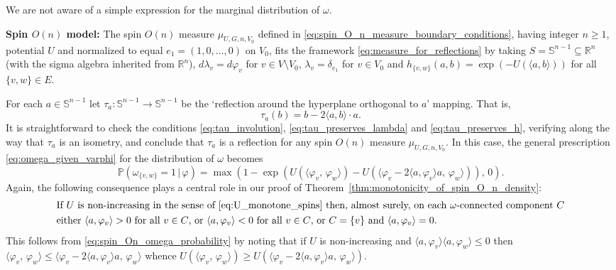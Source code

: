 \documentclass[english]{article}
\renewcommand{\P}{\mathbb{P}}
\theoremstyle{plain}
\theoremstyle{plain}
\begin{document}
We are not aware of a simple expression for the marginal
distribution of $\omega$.

{\bf Spin $O(n)$ model:} The spin $O(n)$ measure $\mu_{U,G,n,V_0}$
defined in \eqref{eq:spin_O_n_measure_boundary_conditions}, having integer $n\ge 1$, potential $U$
and normalized to equal $e_1=(1,0,\ldots,0)$ on $V_0$, fits the framework \eqref{eq:measure_for_reflections} by taking $S =
\mathbb{S}^{n-1}\subseteq\mathbb{R}^n$ (with the sigma algebra
inherited from $\mathbb{R}^n$), $d\lambda_v = d\varphi_v$ for $v\in V\setminus V_0$, $\lambda_v = \delta_{e_1}$ for $v\in V_0$ and $h_{\{v,w\}}(a,b)
= \exp(-U(\langle a,b\rangle))$ for all $\{v,w\}\in E$.

For each $a\in\mathbb{S}^{n-1}$ let
$\tau_a:\mathbb{S}^{n-1}\to\mathbb{S}^{n-1}$ be the `reflection
around the hyperplane orthogonal to $a$' mapping. That is,
\begin{equation}\label{eq:spin_system_reflection}
\tau_a(b) = b - 2\langle a,b\rangle\cdot a.
\end{equation}
It is straightforward
to check the conditions \eqref{eq:tau_involution},
\eqref{eq:tau_preserves_lambda} and \eqref{eq:tau_preserves_h}, verifying along the way that $\tau_a$ is an isometry, and
conclude that $\tau_a$ is a reflection for any spin $O(n)$ measure
$\mu_{U,G,n,V_0}$. In this case, the general prescription
\eqref{eq:omega_given_varphi} for the distribution of $\omega$
becomes
\begin{equation}\label{eq:spin_On_omega_probability}
  \P(\omega_{\{v,w\}} = 1\, |\, \varphi) = \max\left(1 -
  \exp(U(\langle \varphi_v,\, \varphi_w\rangle) - U(\langle\varphi_v - 2\langle a,\varphi_v\rangle a,\, \varphi_w\rangle)),\, 0\right).
\end{equation}
Again, the following consequence plays a central role in our proof
of Theorem~\ref{thm:monotonicity_of_spin_O_n_density}:
\begin{equation}\label{spin_one_sided_reflection}
\begin{split}
  &\text{If $U$ is non-increasing in the sense of
\eqref{eq:U_monotone_spins} then, almost surely, on each $\omega$-connected component $C$}\\
  &\text{either
$\langle a,\varphi_v\rangle> 0$ for all $v\in C$, or $\langle
a,\varphi_v\rangle< 0$ for all $v\in C$, or $C = \{v\}$ and $\langle a,\varphi_v\rangle = 0$.}
\end{split}
\end{equation}
This follows from \eqref{eq:spin_On_omega_probability} by noting
that if $U$ is non-increasing and $\langle a,\varphi_v\rangle\langle
a,\varphi_w\rangle\le 0$ then $\langle \varphi_v,\, \varphi_w\rangle
\le \langle\varphi_v - 2\langle a,\varphi_v\rangle a,\,
\varphi_w\rangle$ whence $U(\langle \varphi_v,\, \varphi_w\rangle)
\ge U(\langle\varphi_v - 2\langle a,\varphi_v\rangle a,\,
\varphi_w\rangle)$.
\end{document}

